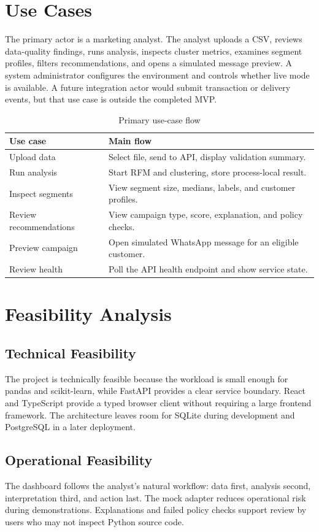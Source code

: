 \documentclass[12pt,a4paper]{report}
\begin{document}
\section{Use Cases}
The primary actor is a marketing analyst. The analyst uploads a CSV, reviews data-quality findings, runs analysis, inspects cluster metrics, examines segment profiles, filters recommendations, and opens a simulated message preview. A system administrator configures the environment and controls whether live mode is available. A future integration actor would submit transaction or delivery events, but that use case is outside the completed MVP.

\begin{table}[H]
\centering
\caption{Primary use-case flow}
\label{tab:usecase}
\begin{tabular}{p{}p{}}
\toprule
Use case & Main flow\\\midrule
Upload data & Select file, send to API, display validation summary.\\
Run analysis & Start RFM and clustering, store process-local result.\\
Inspect segments & View segment size, medians, labels, and customer profiles.\\
Review recommendations & View campaign type, score, explanation, and policy checks.\\
Preview campaign & Open simulated WhatsApp message for an eligible customer.\\
Review health & Poll the API health endpoint and show service state.\\\bottomrule
\end{tabular}
\end{table}

\section{Feasibility Analysis}
\subsection{Technical Feasibility}
The project is technically feasible because the workload is small enough for pandas and scikit-learn, while FastAPI provides a clear service boundary. React and TypeScript provide a typed browser client without requiring a large frontend framework. The architecture leaves room for SQLite during development and PostgreSQL in a later deployment.

\subsection{Operational Feasibility}
The dashboard follows the analyst's natural workflow: data first, analysis second, interpretation third, and action last. The mock adapter reduces operational risk during demonstrations. Explanations and failed policy checks support review by users who may not inspect Python source code.
\end{document}

